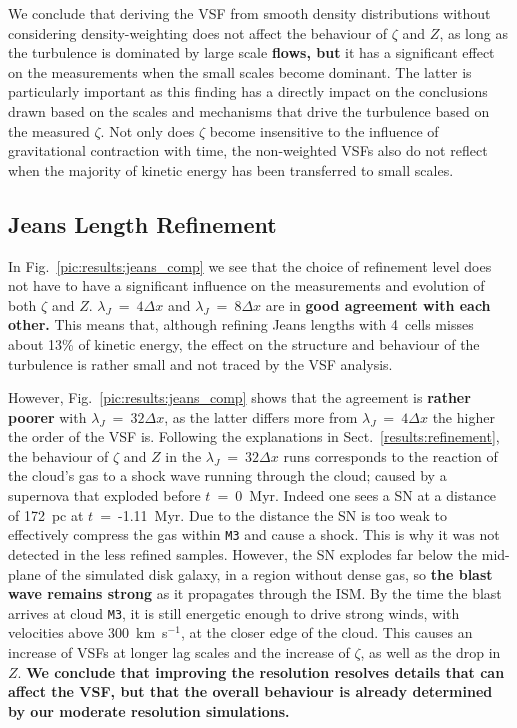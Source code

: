 We conclude that deriving the VSF from smooth density distributions without considering density-weighting does not affect the behaviour of $\zeta$ and $Z$, as long as the turbulence is dominated by large scale \textbf{flows, but} it has a significant effect on the measurements when the small scales become dominant.
The latter is particularly important as this finding has a directly impact on the conclusions drawn based on the scales and mechanisms that drive the turbulence based on the measured $\zeta$.
Not only does $\zeta$ become insensitive to the influence of gravitational contraction with time, the non-weighted VSFs also do not reflect when the majority of kinetic energy has been transferred to small scales. 


\subsection{Jeans Length Refinement}\label{discussion:refinement}

In Fig.~\ref{pic:results:jeans_comp} we see that the choice of refinement level does not have to have a significant influence on the measurements and evolution of both $\zeta$ and $Z$. 
$\lambda_J$~=~$4\Delta{}x$ and $\lambda_J$~=~$8\Delta{}x$ are in \textbf{good agreement with each other.}
This means that, although refining Jeans lengths with 4~cells misses about 13\% of kinetic energy, the effect on the structure and behaviour of the turbulence is rather small and not traced by the VSF analysis.

However, Fig.~\ref{pic:results:jeans_comp} shows that the agreement is \textbf{rather poorer} with $\lambda_J$~=~$32\Delta{}x$, as the latter differs more from $\lambda_J$~=~$4\Delta{}x$ the higher the order of the VSF is.
Following the explanations in Sect.~\ref{results:refinement}, the behaviour of $\zeta$ and $Z$ in the $\lambda_J$~=~$32\Delta{}x$ runs corresponds to the reaction of the cloud's gas to a shock wave running through the cloud; caused by a supernova that exploded before $t$~=~0~Myr. 
Indeed one sees a SN at a distance of 172~pc at \linebreak $t$~=~-1.11~Myr. 
Due to the distance the SN is too weak to effectively compress the gas within \texttt{M3} and cause a shock.
This is why it was not detected in the less refined samples.
However, the SN explodes far below the mid-plane of the simulated disk galaxy, in a region without dense gas, so \textbf{the blast wave remains strong} as it propagates through the ISM. 
By the time the blast arrives at cloud \texttt{M3}, it is still energetic enough to drive strong winds, with velocities above 300~km~s$^{-1}$, at the closer edge of the cloud. 
This causes an increase of VSFs at longer lag scales and the increase of $\zeta$, as well as the drop in $Z$.
\textbf{We conclude that improving the resolution resolves details that can affect the VSF, but that the overall behaviour is already determined by our moderate resolution simulations.}




